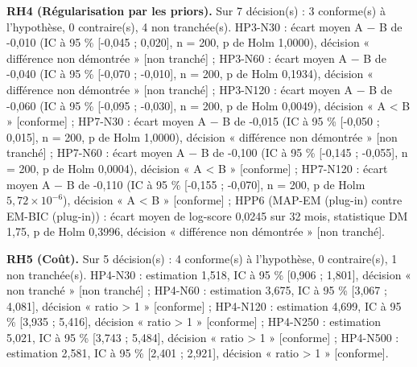 \textbf{RH4 (Régularisation par les priors).} Sur 7 décision(s) : 3 conforme(s) à l'hypothèse, 0 contraire(s), 4 non tranchée(s). HP3-N30 : écart moyen A $-$ B de -0,010 (IC à 95 \% [-0,045 ; 0,020], n = 200, p de Holm 1,0000), décision « différence non démontrée » [non tranché] ; HP3-N60 : écart moyen A $-$ B de -0,040 (IC à 95 \% [-0,070 ; -0,010], n = 200, p de Holm 0,1934), décision « différence non démontrée » [non tranché] ; HP3-N120 : écart moyen A $-$ B de -0,060 (IC à 95 \% [-0,095 ; -0,030], n = 200, p de Holm 0,0049), décision « A < B » [conforme] ; HP7-N30 : écart moyen A $-$ B de -0,015 (IC à 95 \% [-0,050 ; 0,015], n = 200, p de Holm 1,0000), décision « différence non démontrée » [non tranché] ; HP7-N60 : écart moyen A $-$ B de -0,100 (IC à 95 \% [-0,145 ; -0,055], n = 200, p de Holm 0,0004), décision « A < B » [conforme] ; HP7-N120 : écart moyen A $-$ B de -0,110 (IC à 95 \% [-0,155 ; -0,070], n = 200, p de Holm $5{,}72 \times 10^{-6}$), décision « A < B » [conforme] ; HPP6 (MAP-EM (plug-in) contre EM-BIC (plug-in)) : écart moyen de log-score 0,0245 sur 32 mois, statistique DM 1,75, p de Holm 0,3996, décision « différence non démontrée » [non tranché].

\textbf{RH5 (Coût).} Sur 5 décision(s) : 4 conforme(s) à l'hypothèse, 0 contraire(s), 1 non tranchée(s). HP4-N30 : estimation 1,518, IC à 95 \% [0,906 ; 1,801], décision « non tranché » [non tranché] ; HP4-N60 : estimation 3,675, IC à 95 \% [3,067 ; 4,081], décision « ratio > 1 » [conforme] ; HP4-N120 : estimation 4,699, IC à 95 \% [3,935 ; 5,416], décision « ratio > 1 » [conforme] ; HP4-N250 : estimation 5,021, IC à 95 \% [3,743 ; 5,484], décision « ratio > 1 » [conforme] ; HP4-N500 : estimation 2,581, IC à 95 \% [2,401 ; 2,921], décision « ratio > 1 » [conforme].
